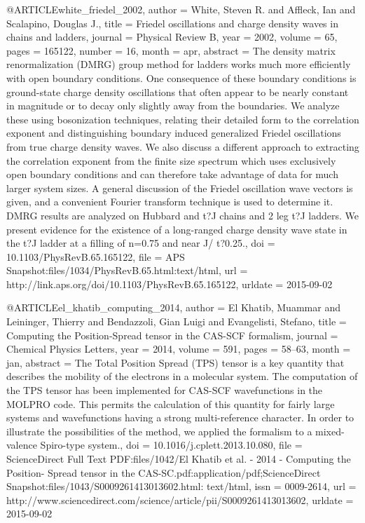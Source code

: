 @ARTICLE{white_friedel_2002,
  author = {White, Steven R. and Affleck, Ian and Scalapino, Douglas J.},
  title = {Friedel oscillations and charge density waves in chains and ladders},
  journal = {Physical Review B},
  year = {2002},
  volume = {65},
  pages = {165122},
  number = {16},
  month = apr,
  abstract = {The density matrix renormalization (DMRG) group method for ladders
	works much more efficiently with open boundary conditions. One consequence
	of these boundary conditions is ground-state charge density oscillations
	that often appear to be nearly constant in magnitude or to decay
	only slightly away from the boundaries. We analyze these using bosonization
	techniques, relating their detailed form to the correlation exponent
	and distinguishing boundary induced generalized Friedel oscillations
	from true charge density waves. We also discuss a different approach
	to extracting the correlation exponent from the finite size spectrum
	which uses exclusively open boundary conditions and can therefore
	take advantage of data for much larger system sizes. A general discussion
	of the Friedel oscillation wave vectors is given, and a convenient
	Fourier transform technique is used to determine it. DMRG results
	are analyzed on Hubbard and t?J chains and 2 leg t?J ladders. We
	present evidence for the existence of a long-ranged charge density
	wave state in the t?J ladder at a filling of n=0.75 and near J/ t?0.25.},
  doi = {10.1103/PhysRevB.65.165122},
  file = {APS Snapshot:files/1034/PhysRevB.65.html:text/html},
  url = {http://link.aps.org/doi/10.1103/PhysRevB.65.165122},
  urldate = {2015-09-02}
}

@ARTICLE{el_khatib_computing_2014,
  author = {El Khatib, Muammar and Leininger, Thierry and Bendazzoli, Gian Luigi
	and Evangelisti, Stefano},
  title = {Computing the {Position}-{Spread} tensor in the {CAS}-{SCF} formalism},
  journal = {Chemical Physics Letters},
  year = {2014},
  volume = {591},
  pages = {58--63},
  month = jan,
  abstract = {The Total Position Spread (TPS) tensor is a key quantity that describes
	the mobility of the electrons in a molecular system. The computation
	of the TPS tensor has been implemented for CAS-SCF wavefunctions
	in the MOLPRO code. This permits the calculation of this quantity
	for fairly large systems and wavefunctions having a strong multi-reference
	character. In order to illustrate the possibilities of the method,
	we applied the formalism to a mixed-valence Spiro-type system.},
  doi = {10.1016/j.cplett.2013.10.080},
  file = {ScienceDirect Full Text PDF:files/1042/El Khatib et al. - 2014 - Computing the Position-      Spread tensor in the CAS-SC.pdf:application/pdf;ScienceDirect Snapshot:files/1043/S0009261413013602.html: text/html},
  issn = {0009-2614},
  url = {http://www.sciencedirect.com/science/article/pii/S0009261413013602},
  urldate = {2015-09-02}
}

